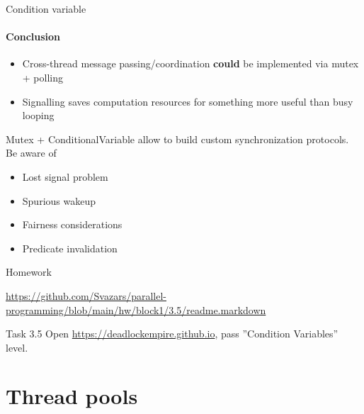 \begin{frame}{Condition variable}
\framesubtitle{Conclusion}

\begin{itemize}
    \item Cross-thread message passing/coordination \textbf{could} be implemented via mutex + polling    
    \item Signalling saves computation resources for something more useful than busy looping
\end{itemize}

Mutex + ConditionalVariable allow to build custom synchronization protocols. Be aware of
\begin{itemize}
    \item Lost signal problem    
    \item Spurious wakeup
    \item Fairness considerations
    \item Predicate invalidation
\end{itemize}
\end{frame}

\begin{frame}{Homework}

{\tiny\url{https://github.com/Svazars/parallel-programming/blob/main/hw/block1/3.5/readme.markdown}}
\begin{homeworkmail}{Task 3.5}
    Open \url{https://deadlockempire.github.io}, pass ''Condition Variables'' level.
\end{homeworkmail}
\end{frame}


\section{Thread pools}
\showTOC

